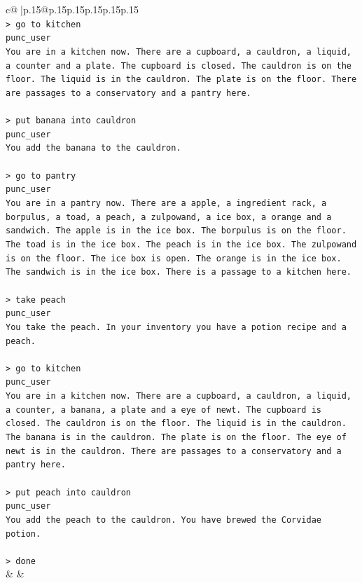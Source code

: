 \documentclass{article}
\begin{document}
{\begin{supertabular}{c@{$\;$}|p{.15\linewidth}@{}p{.15\linewidth}p{.15\linewidth}p{.15\linewidth}p{.15\linewidth}p{.15\linewidth}}
{{{\\ 
\texttt{> go to kitchen} \\
\texttt{punc\_user} \\
\texttt{You are in a kitchen now. There are a cupboard, a cauldron, a liquid, a counter and a plate. The cupboard is closed. The cauldron is on the floor. The liquid is in the cauldron. The plate is on the floor. There are passages to a conservatory and a pantry here.} \\
\\ 
\texttt{> put banana into cauldron} \\
\texttt{punc\_user} \\
\texttt{You add the banana to the cauldron.} \\
\\ 
\texttt{> go to pantry} \\
\texttt{punc\_user} \\
\texttt{You are in a pantry now. There are a apple, a ingredient rack, a borpulus, a toad, a peach, a zulpowand, a ice box, a orange and a sandwich. The apple is in the ice box. The borpulus is on the floor. The toad is in the ice box. The peach is in the ice box. The zulpowand is on the floor. The ice box is open. The orange is in the ice box. The sandwich is in the ice box. There is a passage to a kitchen here.} \\
\\ 
\texttt{> take peach} \\
\texttt{punc\_user} \\
\texttt{You take the peach. In your inventory you have a potion recipe and a peach.} \\
\\ 
\texttt{> go to kitchen} \\
\texttt{punc\_user} \\
\texttt{You are in a kitchen now. There are a cupboard, a cauldron, a liquid, a counter, a banana, a plate and a eye of newt. The cupboard is closed. The cauldron is on the floor. The liquid is in the cauldron. The banana is in the cauldron. The plate is on the floor. The eye of newt is in the cauldron. There are passages to a conservatory and a pantry here.} \\
\\ 
\texttt{> put peach into cauldron} \\
\texttt{punc\_user} \\
\texttt{You add the peach to the cauldron. You have brewed the Corvidae potion.} \\
\\ 
\texttt{> done} \\
            }
        }
    }
    & & \\ \\


\end{supertabular}}
\end{document}
